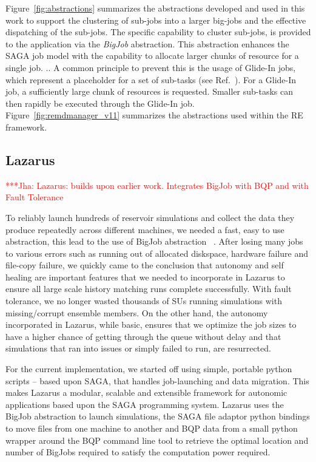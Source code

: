 \documentclass[conference,final]{IEEEtran}
\newcommand{\jhanote}[1]{ {\textcolor{red} { ***Jha: #1 }}}
\newcommand{\yyenote}[1]{ {\textcolor{blue} { ***yye00: #1 }}}
\newcommand{\jhanote}[1]{}
\newcommand{\yyenote}[1]{}
\begin{document}
Figure~\ref{fig:abstractions} summarizes the abstractions developed
and used in this work to support the clustering of sub-jobs into a
larger big-jobs and the effective dispatching of the sub-jobs.  The
specific capability to cluster sub-jobs, is provided to the
application via the \emph{BigJob} abstraction. This abstraction
enhances the SAGA job model with the capability to allocate larger
chunks of resource for a single job.
.. A common principle to prevent this is the
usage of Glide-In jobs, which represent a placeholder for a set of
sub-tasks (see Ref.~\cite{citeulike:291860}).  For a Glide-In
job, a sufficiently large chunk of resources is requested. Smaller
sub-tasks can then rapidly be executed through the Glide-In job.
Figure~\ref{fig:remdmanager_v11} summarizes the abstractions used
within the RE framework.
\subsection{Lazarus}


\jhanote{Lazarus: builds upon earlier work. Integrates BigJob with BQP
  and with Fault Tolerance}

To reliably launch hundreds of reservoir simulations and collect the data
they produce repeatedly across different machines,
we needed a fast, easy to use abstraction, this lead to the use
of BigJob abstraction ~\cite{ICCS_paper, saga_royalsoc}.
After losing many jobs to various errors
such as running out of allocated diskspace, hardware failure
and file-copy failure, we quickly came to the conclusion that autonomy
and self healing are important features that we needed to incorporate 
in Lazarus to ensure all large scale history matching runs
complete successfully. With fault tolerance, we no longer wasted
thousands of SUs running simulations with missing/corrupt ensemble members.
On the other hand, the autonomy incorporated in Lazarus, while basic,
ensures that we optimize the job sizes to have a higher chance of getting
through the queue without delay and that simulations
that ran into issues or simply failed to run, are resurrected.

For the current implementation, we started off using simple, portable
python scripts -- based upon SAGA, that handles job-launching and data
migration. This makes Lazarus a modular,
scalable and extensible framework for autonomic applications based upon
the SAGA programming system.  Lazarus uses the BigJob
abstraction to launch simulations,
the SAGA file adaptor python bindings to move files from one machine
to another and BQP data from a small python wrapper around the BQP command line tool
to retrieve the optimal location and number of BigJobs required to satisfy the
computation power required.
\end{document}
